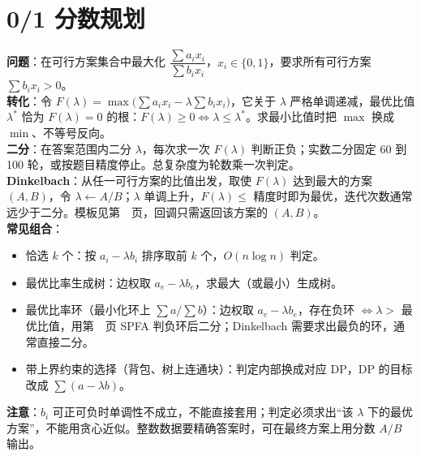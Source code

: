 \section{0/1 分数规划}\label{knowledge-frac-programming}
\textbf{问题}：在可行方案集合中最大化 $\dfrac{\sum a_i x_i}{\sum b_i x_i}$，$x_i\in\{0,1\}$，要求所有可行方案 $\sum b_ix_i>0$。\\
\textbf{转化}：令 $F(\lambda)=\max\bigl(\sum a_ix_i-\lambda\sum b_ix_i\bigr)$，它关于 $\lambda$ 严格单调递减，最优比值 $\lambda^*$ 恰为 $F(\lambda)=0$ 的根：$F(\lambda)\ge0\iff\lambda\le\lambda^*$。求最小比值时把 $\max$ 换成 $\min$、不等号反向。\\
\textbf{二分}：在答案范围内二分 $\lambda$，每次求一次 $F(\lambda)$ 判断正负；实数二分固定 60 到 100 轮，或按题目精度停止。总复杂度为轮数乘一次判定。\\
\textbf{Dinkelbach}：从任一可行方案的比值出发，取使 $F(\lambda)$ 达到最大的方案 $(A,B)$，令 $\lambda\gets A/B$；$\lambda$ 单调上升，$F(\lambda)\le$ 精度时即为最优，迭代次数通常远少于二分。模板见第~\pageref{compact-dinkelbach}~页，回调只需返回该方案的 $(A,B)$。\\
\textbf{常见组合}：
\begin{itemize}
\item 恰选 $k$ 个：按 $a_i-\lambda b_i$ 排序取前 $k$ 个，$O(n\log n)$ 判定。
\item 最优比率生成树：边权取 $a_e-\lambda b_e$，求最大（或最小）生成树。
\item 最优比率环（最小化环上 $\sum a/\sum b$）：边权取 $a_e-\lambda b_e$，存在负环 $\iff\lambda>$ 最优比值，用第~\pageref{compact-Spfa}~页 SPFA 判负环后二分；Dinkelbach 需要求出最负的环，通常直接二分。
\item 带上界约束的选择（背包、树上连通块）：判定内部换成对应 DP，DP 的目标改成 $\sum(a-\lambda b)$。
\end{itemize}
\textbf{注意}：$b_i$ 可正可负时单调性不成立，不能直接套用；判定必须求出“该 $\lambda$ 下的最优方案”，不能用贪心近似。整数数据要精确答案时，可在最终方案上用分数 $A/B$ 输出。
